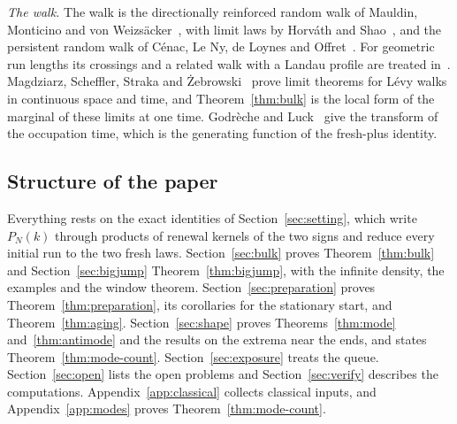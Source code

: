 \emph{The walk.} The walk is the directionally reinforced random walk of Mauldin, Monticino
and von Weizs\"acker~\cite{mmw1996}, with limit laws by Horv\'ath and
Shao~\cite{horvathshao1998}, and the persistent random walk of C\'enac, Le Ny, de Loynes and
Offret~\cite{clnlo2018,clnlo2019}. For geometric run lengths its crossings and a related walk
with a Landau profile are treated in~\cite{paperA,paperD}. Magdziarz, Scheffler, Straka and
\.Zebrowski~\cite{mssz2015} prove limit theorems for L\'evy walks in continuous space and
time, and Theorem~\ref{thm:bulk} is the local form of the marginal of these limits at one
time. Godr\`eche and Luck~\cite{godrecheluck2001} give the transform of the occupation time,
which is the generating function of the fresh-plus identity.

\subsection{Structure of the paper}\label{sec:intro-structure}

Everything rests on the exact identities of Section~\ref{sec:setting}, which write $P_N(k)$
through products of renewal kernels of the two signs and reduce every initial run to the two
fresh laws. Section~\ref{sec:bulk} proves Theorem~\ref{thm:bulk} and Section~\ref{sec:bigjump}
Theorem~\ref{thm:bigjump}, with the infinite density, the examples and the window theorem.
Section~\ref{sec:preparation} proves Theorem~\ref{thm:preparation}, its corollaries for the
stationary start, and Theorem~\ref{thm:aging}. Section~\ref{sec:shape} proves
Theorems~\ref{thm:mode} and~\ref{thm:antimode} and the results on the extrema near the ends,
and states Theorem~\ref{thm:mode-count}. Section~\ref{sec:exposure} treats the queue.
Section~\ref{sec:open} lists the open problems and Section~\ref{sec:verify} describes the
computations. Appendix~\ref{app:classical} collects classical inputs, and
Appendix~\ref{app:modes} proves Theorem~\ref{thm:mode-count}.
